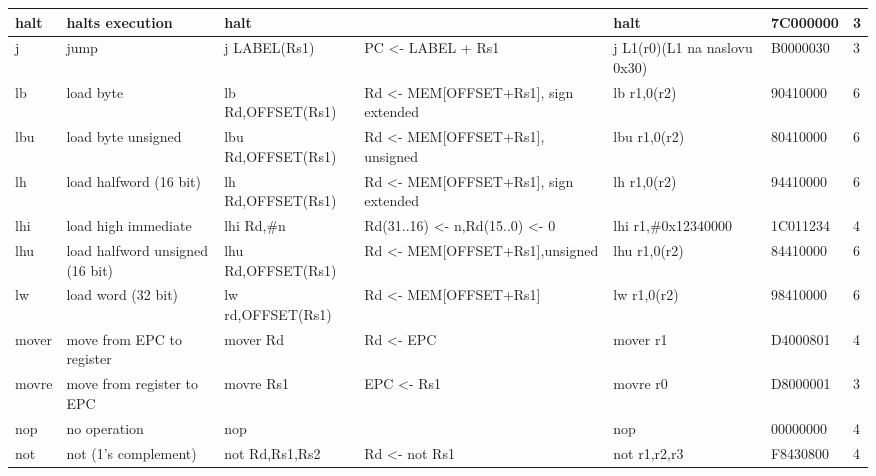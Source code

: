 \documentclass[a4paper,9pt]{extarticle}
\begin{document}
{\begin{tabular}{| p{0.6cm} | p{4cm} | p{3cm} | p{4cm} | p{3cm} | l | l | }
        halt    & halts execution                       & halt                  &                                       & halt                                  & 7C000000  & 3\\ \hline
        j       & jump                                  & j LABEL(Rs1)          & PC <- LABEL + Rs1                     & j L1(r0)(L1 na naslovu 0x30)          & B0000030  & 3\\ \hline
        lb      & load byte                             & lb Rd,OFFSET(Rs1)     & Rd <- MEM[OFFSET+Rs1], sign extended  & lb r1,0(r2)                           & 90410000  & 6\\ \hline
        lbu     & load byte unsigned                    & lbu Rd,OFFSET(Rs1)    & Rd <- MEM[OFFSET+Rs1], unsigned       & lbu r1,0(r2)                          & 80410000  & 6\\ \hline
        lh      & load halfword (16 bit)                & lh Rd,OFFSET(Rs1)     & Rd <- MEM[OFFSET+Rs1], sign extended  & lh r1,0(r2)                           & 94410000  & 6\\ \hline 
        lhi     & load high immediate                   & lhi Rd,\#n            & Rd(31..16) <- n,Rd(15..0) <- 0        & lhi r1,\#0x12340000                   & 1C011234  & 4\\ \hline
        lhu     & load halfword unsigned (16 bit)       & lhu Rd,OFFSET(Rs1)    & Rd <- MEM[OFFSET+Rs1],unsigned        & lhu r1,0(r2)                          & 84410000  & 6\\ \hline
        lw      & load word (32 bit)                    & lw rd,OFFSET(Rs1)     & Rd <- MEM[OFFSET+Rs1]                 & lw r1,0(r2)                           & 98410000  & 6\\ \hline
        mover   & move from EPC to register             & mover Rd              & Rd <- EPC                             & mover r1                              & D4000801  & 4\\ \hline
        movre   & move from register to EPC             & movre Rs1             & EPC <- Rs1                            & movre r0                              & D8000001  & 3\\ \hline
        nop     & no operation                          & nop                   &                                       & nop                                   & 00000000  & 4\\ \hline
        not     & not (1's complement)                  & not Rd,Rs1,Rs2        & Rd <- not Rs1                         & not r1,r2,r3                          & F8430800  & 4\\ \hline

\end{tabular}}
\end{document}
